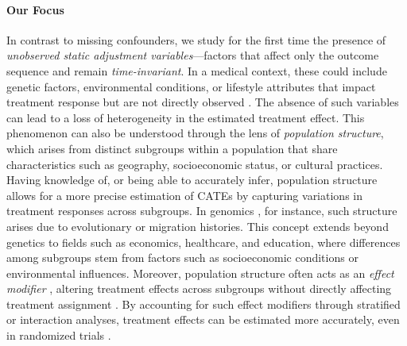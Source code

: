 \documentclass[10pt]{article} %
\begin{document}
\paragraph{Our Focus} In contrast to missing confounders, we study for the first time the presence of \emph{unobserved static adjustment variables}—factors that affect only the outcome sequence and remain \emph{time-invariant}. In a medical context, these could include genetic factors, environmental conditions, or lifestyle attributes that impact treatment response but are not directly observed \citep{sadowski2024characterizing}. The absence of such variables can lead to a loss of heterogeneity in the estimated treatment effect. This phenomenon can also be understood through the lens of \emph{population structure}, which arises from distinct subgroups within a population that share characteristics such as geography, socioeconomic status, or cultural practices. Having knowledge of, or being able to accurately infer, population structure allows for a more precise estimation of CATEs by capturing variations in treatment responses across subgroups. In genomics \citep{laird2011fundamentalsgenetics, peter2020genetic}, for instance, such structure arises due to evolutionary or migration histories. This concept extends beyond genetics to fields such as economics, healthcare, and education, where differences among subgroups stem from factors such as socioeconomic conditions or environmental influences. Moreover, population structure often acts as an \emph{effect modifier} \citep{hernan_whatif_2020}, altering treatment effects across subgroups without directly affecting treatment assignment \citep{hyun2024increased}. By accounting for such effect modifiers through stratified or interaction analyses, treatment effects can be estimated more accurately, even in randomized trials \citep{schochet2024design}. 
\end{document}
